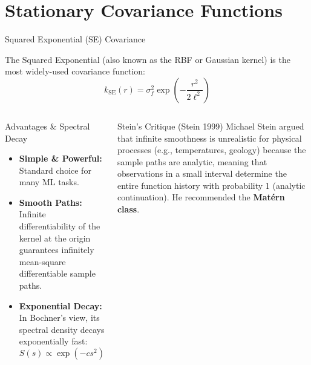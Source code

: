 \documentclass[aspectratio=169, 10pt]{beamer}
\begin{document}
\section{Stationary Covariance Functions}

\begin{frame}{Squared Exponential (SE) Covariance}
  
  The Squared Exponential (also known as the RBF or Gaussian kernel) is the most widely-used covariance function:
  \[
    k_{\text{SE}}(r) = \sigma_f^2 \exp\left(-\frac{r^2}{2\ell^2}\right)
  \]
  
  \begin{columns}[t]
      \begin{block}{Advantages \& Spectral Decay}
        \scriptsize
        \begin{itemize}
          \item \textbf{Simple \& Powerful:} Standard choice for many ML tasks.
          \item \textbf{Smooth Paths:} Infinite differentiability of the kernel at the origin guarantees infinitely mean-square differentiable sample paths.
          \item \textbf{Exponential Decay:} In Bochner's view, its spectral density decays exponentially fast:
            \[
              S(s) \propto \exp\left(-c s^2\right)
            \]
        \end{itemize}
      \end{block}
      
      \begin{block}{Stein's Critique (Stein 1999)}
        \scriptsize
        Michael Stein argued that infinite smoothness is unrealistic for physical processes (e.g., temperatures, geology) because the sample paths are analytic, meaning that observations in a small interval determine the entire function history with probability 1 (analytic continuation). He recommended the \textbf{Matérn class}.
      \end{block}
  \end{columns}
\end{frame}
\end{document}
